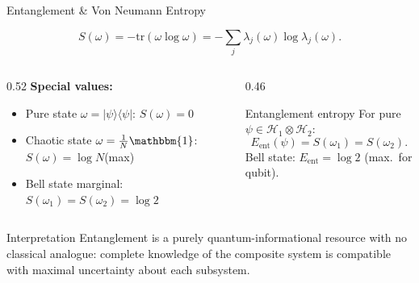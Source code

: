 \documentclass{beamer}
\newcommand{\Hilb}{\mathcal{H}}
\newcommand{\tr}{\mathrm{tr}}
\newcommand{\ket}[1]{|#1\rangle}
\newcommand{\bra}[1]{\langle#1|}
\begin{document}
\begin{frame}[shrink=10]{Entanglement \& Von Neumann Entropy}
  \begin{tcolorbox}[defbox, title={Von Neumann Entropy}]
    \[
      S(\omega) = -\tr(\omega\log\omega) = -\sum_j\lambda_j(\omega)\log\lambda_j(\omega).
    \]
  \end{tcolorbox}

  \begin{columns}[T]
    \begin{column}{0.52\textwidth}
      \textbf{Special values:}
      \begin{itemize}
        \item Pure state $\omega=\ket\psi\bra\psi$: \quad $S(\omega)=0$
        \item Chaotic state $\omega=\tfrac{1}{N}\mathbbm{1}$: \quad $S(\omega)=\log N$\quad (max)
        \item Bell state marginal: \quad $S(\omega_1)=S(\omega_2)=\log 2$
      \end{itemize}
    \end{column}
    \begin{column}{0.46\textwidth}
      \begin{block}{Entanglement entropy}
        For pure $\psi\in\Hilb_1\otimes\Hilb_2$:
        \[
          E_\mathrm{ent}(\psi)=S(\omega_1)=S(\omega_2).
        \]
        Bell state: $E_\mathrm{ent}=\log 2$ (max.\ for qubit).
      \end{block}
    \end{column}
  \end{columns}

  \vspace{0.3em}
  \begin{alertblock}{Interpretation}
    Entanglement is a purely quantum-informational resource with no classical analogue:
    complete knowledge of the composite system is compatible with maximal uncertainty
    about each subsystem.
  \end{alertblock}
\end{frame}
\end{document}
